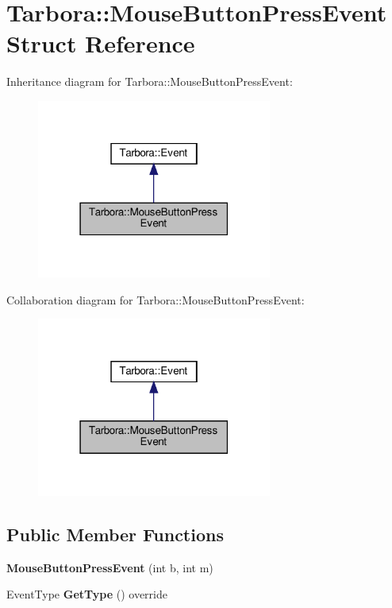 \hypertarget{structTarbora_1_1MouseButtonPressEvent}{}\section{Tarbora\+:\+:Mouse\+Button\+Press\+Event Struct Reference}
\label{structTarbora_1_1MouseButtonPressEvent}


Inheritance diagram for Tarbora\+:\+:Mouse\+Button\+Press\+Event\+:\nopagebreak
\begin{figure}[H]
\begin{center}
\leavevmode
\includegraphics[width=219pt]{structTarbora_1_1MouseButtonPressEvent__inherit__graph}
\end{center}
\end{figure}


Collaboration diagram for Tarbora\+:\+:Mouse\+Button\+Press\+Event\+:\nopagebreak
\begin{figure}[H]
\begin{center}
\leavevmode
\includegraphics[width=219pt]{structTarbora_1_1MouseButtonPressEvent__coll__graph}
\end{center}
\end{figure}
\subsection*{Public Member Functions}
\begin{DoxyCompactItemize}
\item 
\mbox{\label{structTarbora_1_1MouseButtonPressEvent_ab1b13aaa5d41cd6dd4d7fca82f151925}} 
{\bfseries Mouse\+Button\+Press\+Event} (int b, int m)
\item 
\mbox{\label{structTarbora_1_1MouseButtonPressEvent_af90b36215e7ffcde1150e8d4fd2241b6}} 
Event\+Type {\bfseries Get\+Type} () override
\end{DoxyCompactItemize}
